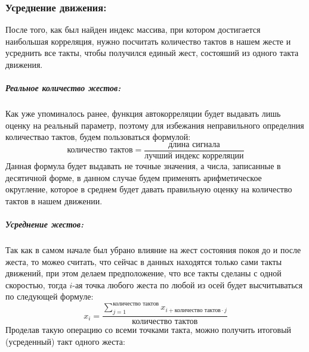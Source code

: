 \subsubsection{Усреднение движения:}
После того, как был найден индекс массива, при котором достигается наибольшая корреляция, нужно посчитать количество тактов в нашем жесте и усреднить все такты, чтобы получился единый жест, состояший из одного такта движения.

\subparagraph{Реальное количество жестов:}
Как уже упоминалось ранее, функция автокорреляции будет выдавать лишь оценку на реальный параметр, поэтому для избежания неправильного определния количествао тактов, будем пользоваться формулой:
\[\text{количество тактов} = \dfrac{\text{длина сигнала}}{\text{лучший индекс корреляции}}\]
Данная формула будет выдавать не точные значения, а числа, записанные в десятичной форме, в данном случае будем применять арифметическое округление, которое в среднем будет давать правильную оценку на количество тактов в нашем движении.
\subparagraph{Усреднение жестов:}
Так как в самом начале был убрано влияние на жест состояния покоя до и после жеста, то можео считать, что сейчас в данных находятся только сами такты движений, при этом делаем предположение, что все такты сделаны с одной скоростью, тогда $i$-ая точка любого жеста по любой из осей будет высчитываться по следующей формуле:
\[x_i = \dfrac{\sum_{j = 1}^{\text{количество тактов}} x_{i + \text{количество тактов} \cdot j}}{\text{количество тактов}}\]
Проделав такую операцию со всеми точками такта, можно получить итоговый (усреденный) такт одного жеста:

\begin{figure}[H]
\end{figure}

